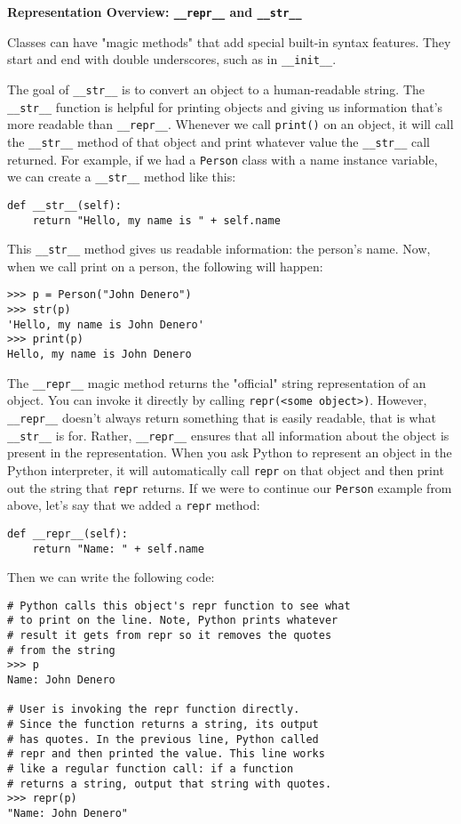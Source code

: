 \textbf{Representation Overview: \lstinline{__repr__} and \lstinline{__str__}}

Classes can have "magic methods" that add special built-in syntax features. They start and end with double underscores, such as in \lstinline{__init__}.

The goal of \lstinline{__str__} is to convert an object to a human-readable string. The \lstinline{__str__} function is helpful for printing objects and giving us information that's more readable than \lstinline{__repr__}. Whenever we call \lstinline{print()} on an object, it will call the \lstinline{__str__} method of that object and print whatever value the \lstinline{__str__} call returned. For example, if we had a \lstinline{Person} class with a name instance variable, we can create a \lstinline{__str__} method like this:
\begin{lstlisting}
def __str__(self):
    return "Hello, my name is " + self.name
\end{lstlisting}
This \lstinline{__str__} method gives us readable information: the person's name. Now, when we call print on a person, the following will happen:
\begin{lstlisting}
>>> p = Person("John Denero")
>>> str(p)
'Hello, my name is John Denero'
>>> print(p)              
Hello, my name is John Denero
\end{lstlisting}

The \lstinline{__repr__} magic method returns the "official" string representation of an object. You can invoke it directly by calling \lstinline{repr(<some object>)}. However, \lstinline{__repr__} doesn't always return something that is easily readable, that is what \lstinline{__str__} is for. Rather, \lstinline{__repr__} ensures that all information about the object is present in the representation. When you ask Python to represent an object in the Python interpreter, it will automatically call \lstinline{repr} on that object and then print out the string that \lstinline{repr} returns. If we were to continue our \lstinline{Person} example from above, let's say that we added a \lstinline{repr} method:

\begin{lstlisting}
def __repr__(self):
    return "Name: " + self.name
\end{lstlisting}

Then we can write the following code:

\begin{lstlisting}
# Python calls this object's repr function to see what
# to print on the line. Note, Python prints whatever 
# result it gets from repr so it removes the quotes
# from the string
>>> p 
Name: John Denero

# User is invoking the repr function directly.
# Since the function returns a string, its output
# has quotes. In the previous line, Python called
# repr and then printed the value. This line works 
# like a regular function call: if a function 
# returns a string, output that string with quotes.
>>> repr(p) 
"Name: John Denero"
\end{lstlisting}


